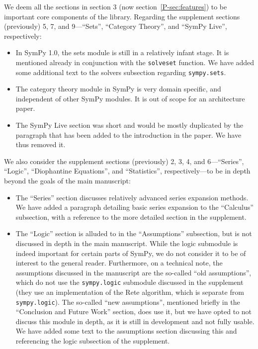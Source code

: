 \documentclass[answers,12pt]{exam}
\begin{document}
\begin{questions}
\begin{solution}
We deem all the sections in section 3 (now section~\ref{P-sec:features}) to be important core
components of the library. Regarding the supplement sections (previously) 5,
7, and 9---``Sets'', ``Category Theory'', and ``SymPy Live'',
respectively:
\begin{itemize}
\item In SymPy 1.0, the sets module is still in
a relatively infant stage. It is mentioned already in conjunction with the
\texttt{solveset} function. We have added some additional text to the solvers
subsection regarding \texttt{sympy.sets}.

\item The category theory module in SymPy
is very domain specific, and independent of other SymPy modules. It is out of
scope for an architecture paper.

\item The SymPy Live section was short and would be mostly duplicated by the
  paragraph that has been added to the introduction in the paper. We have thus
  removed it.
\end{itemize}

We also consider the supplement sections (previously) 2, 3, 4, and
6---``Series'', ``Logic'', ``Diophantine Equations'', and ``Statistics'',
respectively---to be in depth beyond the goals of the main manuscript:

\begin{itemize}
\item The ``Series'' section discusses relatively advanced series expansion methods. We
have added a paragraph detailing basic series expansion to the ``Calculus''
subsection, with a reference to the more detailed section in the supplement.

\item The ``Logic'' section is alluded to in the ``Assumptions'' subsection,
  but is not discussed in depth in the main manuscript. While the logic
  submodule is indeed important for certain parts of SymPy, we do not consider
  it to be of interest to the general reader. Furthermore, on a technical
  note, the assumptions discussed in the manuscript are the so-called ``old
  assumptions'', which do not use the \texttt{sympy.logic} submodule discussed
  in the supplement (they use an implementation of the Rete algorithm, which
  is separate from \texttt{sympy.logic}). The so-called ``new assumptions'',
  mentioned briefly in the ``Conclusion and Future Work'' section, does use
  it, but we have opted to not discuss this module in depth, as it is still in
  development and not fully usable. We have added some text to the assumptions
  section discussing this and referencing the logic subsection of the
  supplement.


\end{itemize}
\end{solution}
\end{questions}
\end{document}
